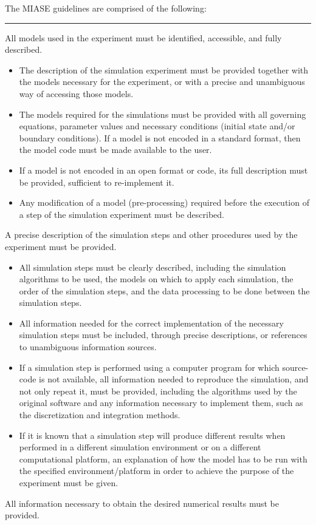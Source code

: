 The MIASE guidelines are comprised of the following:

\begin{center}\rule{3in}{0.4pt}\end{center}

All models used in the experiment must be identified, accessible, and
fully described.

\begin{itemize}
\item
  The description of the simulation experiment must be provided together
  with the models necessary for the experiment, or with a precise and
  unambiguous way of accessing those models.
\item
  The models required for the simulations must be provided with all
  governing equations, parameter values and necessary conditions
  (initial state and/or boundary conditions). If a model is not encoded
  in a standard format, then the model code must be made available to
  the user.
\item
  If a model is not encoded in an open format or code, its full
  description must be provided, sufficient to re-implement it.
\item
  Any modification of a model (pre-processing) required before the
  execution of a step of the simulation experiment must be described.
\end{itemize}
A precise description of the simulation steps and other procedures used
by the experiment must be provided.

\begin{itemize}
\item
  All simulation steps must be clearly described, including the
  simulation algorithms to be used, the models on which to apply each
  simulation, the order of the simulation steps, and the data processing
  to be done between the simulation steps.
\item
  All information needed for the correct implementation of the necessary
  simulation steps must be included, through precise descriptions, or
  references to unambiguous information sources.
\item
  If a simulation step is performed using a computer program for which
  source-code is not available, all information needed to reproduce the
  simulation, and not only repeat it, must be provided, including the
  algorithms used by the original software and any information necessary
  to implement them, such as the discretization and integration methods.
\item
  If it is known that a simulation step will produce different results
  when performed in a different simulation environment or on a different
  computational platform, an explanation of how the model has to be run
  with the specified environment/platform in order to achieve the
  purpose of the experiment must be given.
\end{itemize}
All information necessary to obtain the desired numerical results must
be provided.

